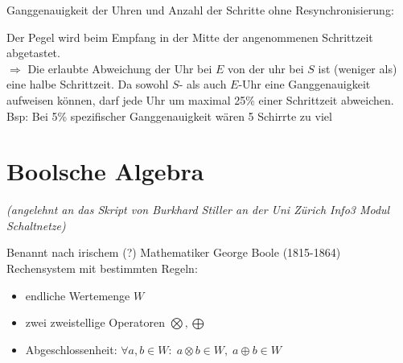 \documentclass[10pt,a4paper]{scrartcl}
\begin{document}
Ganggenauigkeit der Uhren und Anzahl der Schritte ohne Resynchronisierung:
\begin{center}
\end{center}
Der Pegel wird beim Empfang in der Mitte der angenommenen Schrittzeit abgetastet.\\
$\Rightarrow$ Die erlaubte Abweichung der Uhr bei $E$ von der uhr bei $S$ ist (weniger als) eine halbe Schrittzeit. Da sowohl $S$- als auch $E$-Uhr eine Ganggenauigkeit aufweisen können, darf jede Uhr um maximal 25\% einer Schrittzeit abweichen.\\
Bsp: Bei 5\% spezifischer Ganggenauigkeit wären 5 Schirrte \glqq zu viel\grqq

\section{Boolsche Algebra}
\begin{center}
	\textit{(angelehnt an das Skript von Burkhard Stiller an der Uni Zürich \glqq Info3 Modul Schaltnetze\grqq)
}
\end{center}
Benannt nach irischem (?) Mathematiker George Boole (1815-1864)\\
Rechensystem mit bestimmten Regeln:
\begin{itemize}
\item endliche Wertemenge $W$
\item zwei zweistellige Operatoren $\bigotimes, \bigoplus$
\item Abgeschlossenheit: $\forall a, b \in W\!: \; a \otimes  b \in W, \; a \oplus b \in W$
\end{itemize}
\end{document}
